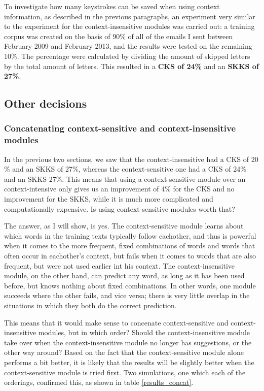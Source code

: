 \documentclass[12pt]{article}
\begin{document}
To investigate how many keystrokes can be saved when using context information, as described in the previous paragraphs, an experiment very similar to the experiment for the context-insensitive modules was carried out: a training corpus was created on the basis of 90\% of all of the emails I sent between February 2009 and February 2013, and the results were tested on the remaining 10\%. The percentage were calculated by dividing the amount of skipped letters by the total amount of letters. This resulted in a \textbf{CKS of 24\%} and an \textbf{SKKS of 27\%}.

\subsection{Other decisions}

\subsubsection{Concatenating context-sensitive and context-insensitive modules} \label{concat}
In the previous two sections, we saw that the context-insensitive had a CKS of 20 \% and an SKKS of 27\%, whereas the context-sensitive one had a CKS of 24\% and an SKKS 27\%. This means that using a context-sensitive module over an context-intensive only gives us an improvement of 4\% for the CKS and no improvement for the SKKS, while it is much more complicated and computationally expensive. Is using context-sensitive modules worth that?

The answer, as I will show, is yes. The context-sensitive module learns about which words in the training texts typically follow eachother, and thus is powerful when it comes to the more frequent, fixed combinations of words and words that often occur in eachother's context, but fails when it comes to words that are also frequent, but were not used earlier int his context. The context-insensitive module, on the other hand, can predict any word, as long as it has been used before, but knows nothing about fixed combinations. In other words, one module succeeds where the other fails, and vice versa; there is very little overlap in the situations in which they both do the correct prediction. 

This means that it would make sense to concenate context-sensitive and context-insensitive modules, but in which order? Should the context-insensitive module take over when the context-insensitive module no longer has suggestions, or the other way around? Based on the fact that the context-sensitive module alone performs a bit better, it is likely that the results will be slightly better when the context-sensitive module is tried first. Two simulations, one which each of the orderings, confirmed this, as shown in table \ref{results_concat}.
\end{document}

